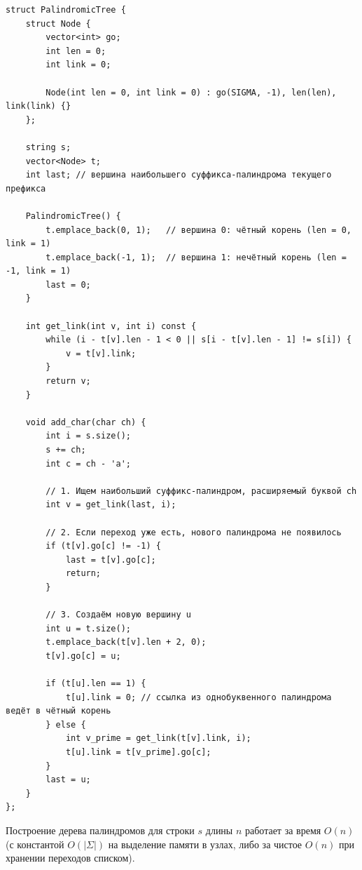 \begin{lstlisting}[caption={Реализация дерева палиндромов (Eertree) за $O(n)$}]
struct PalindromicTree {
    struct Node {
        vector<int> go;
        int len = 0;
        int link = 0;

        Node(int len = 0, int link = 0) : go(SIGMA, -1), len(len), link(link) {}
    };

    string s;
    vector<Node> t;
    int last; // вершина наибольшего суффикса-палиндрома текущего префикса

    PalindromicTree() {
        t.emplace_back(0, 1);   // вершина 0: чётный корень (len = 0, link = 1)
        t.emplace_back(-1, 1);  // вершина 1: нечётный корень (len = -1, link = 1)
        last = 0;
    }

    int get_link(int v, int i) const {
        while (i - t[v].len - 1 < 0 || s[i - t[v].len - 1] != s[i]) {
            v = t[v].link;
        }
        return v;
    }

    void add_char(char ch) {
        int i = s.size();
        s += ch;
        int c = ch - 'a';

        // 1. Ищем наибольший суффикс-палиндром, расширяемый буквой ch
        int v = get_link(last, i);

        // 2. Если переход уже есть, нового палиндрома не появилось
        if (t[v].go[c] != -1) {
            last = t[v].go[c];
            return;
        }

        // 3. Создаём новую вершину u
        int u = t.size();
        t.emplace_back(t[v].len + 2, 0);
        t[v].go[c] = u;

        if (t[u].len == 1) {
            t[u].link = 0; // ссылка из однобуквенного палиндрома ведёт в чётный корень
        } else {
            int v_prime = get_link(t[v].link, i);
            t[u].link = t[v_prime].go[c];
        }
        last = u;
    }
};
\end{lstlisting}

\begin{theorem}
    Построение дерева палиндромов для строки $s$ длины $n$ работает за время $O(n)$ (с константой $O(|\Sigma|)$ на выделение памяти в узлах, либо за чистое $O(n)$ при хранении переходов списком).
\end{theorem}

